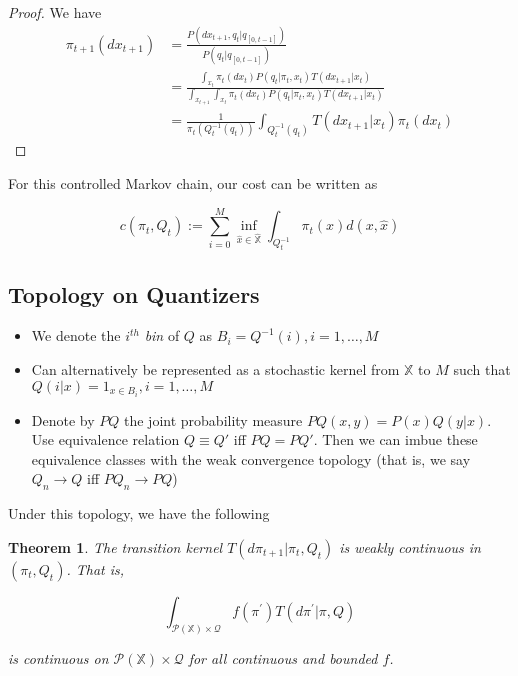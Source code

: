 \documentclass{article}
\newtheorem{theorem}{Theorem}[section]
\begin{document}
\begin{proof}
    We have
    \begin{align*}
        \pi_{t+1}(dx_{t+1}) & = \frac{P(dx_{t+1},q_t | q_{[0,t-1]})}{P(q_t | q_{[0,t-1]})}                                                                          \\
                            & = \frac{\int_{x_t}\pi_t(dx_t)P(q_t | \pi_t,x_t)T(dx_{t+1}|x_t)}{\int_{x_{t+1}}\int_{x_t}\pi_t(dx_t)P(q_t | \pi_t,x_t)T(dx_{t+1}|x_t)} \\
                            & = \frac{1}{\pi_t(Q_t^{-1}(q_t))}\int_{Q_t^{-1}(q_t)}T(dx_{t+1} | x_t)\pi_t(dx_t)
    \end{align*}
\end{proof}

For this controlled Markov chain, our cost can be written as

\begin{equation}\label{eq:cost}
    c(\pi_t, Q_t) := \sum_{i=0}^M \inf_{\hat{x} \in \hat{\mathbb{X}}} \int_{Q_t^{-1}} \pi_t(x)d(x,\hat{x})
\end{equation}

\subsection{Topology on Quantizers}
\begin{itemize}
    \item We denote the \( i^{th} \) \emph{bin} of \( Q \) as \( B_i = Q^{-1}(i), i=1,\ldots,M \)
    \item Can alternatively be represented as a stochastic kernel from \( \mathbb{X} \) to \( M \) such that \( Q(i|x) = 1_{x \in B_i}, i=1,\ldots,M \)
    \item Denote by \( PQ \) the joint probability measure \( PQ(x,y) = P(x)Q(y|x) \). Use equivalence relation \( Q \equiv Q' \) iff \( PQ = PQ' \). Then we can imbue these equivalence classes with the weak convergence topology (that is, we say \( Q_n \to Q \) iff \( PQ_n \to PQ \))
\end{itemize}

Under this topology, we have the following
\begin{theorem}
    The transition kernel \( T(d\pi_{t+1}|\pi_t,Q_t) \) is weakly continuous in \( (\pi_t,Q_t) \). That is,

    \[ \int_{\mathcal{P}(\mathbb{X}) \times \mathcal{Q}} f(\pi^{'})T(d \pi^{'}|\pi, Q) \]

    is continuous on \( \mathcal{P}(\mathbb{X}) \times \mathcal{Q} \) for all continuous and bounded \(f\).
\end{theorem}
\end{document}
